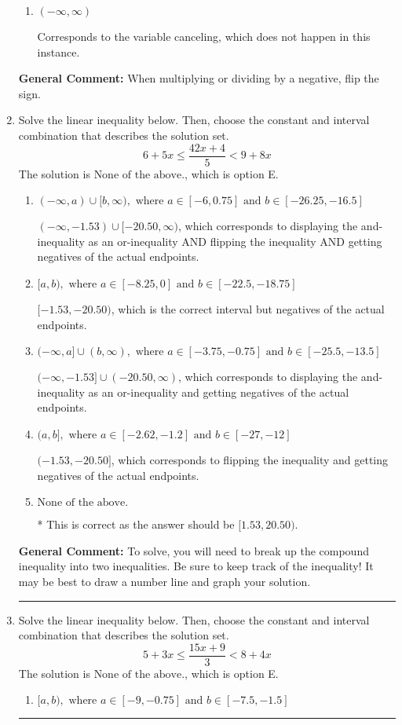 \documentclass{extbook}[14pt]
\newcommand{\litem}[1]{\item #1

\rule{\textwidth}{0.4pt}}
\begin{document}
\begin{enumerate}
{\begin{enumerate}[label=\Alph*.]
 * Correct option.
\item \( (-\infty, \infty) \)

Corresponds to the variable canceling, which does not happen in this instance.
\end{enumerate}

\textbf{General Comment:} When multiplying or dividing by a negative, flip the sign.
}
\litem{
Solve the linear inequality below. Then, choose the constant and interval combination that describes the solution set.
\[ 6 + 5 x \leq \frac{42 x + 4}{5} < 9 + 8 x \]The solution is \( \text{None of the above.} \), which is option E.\begin{enumerate}[label=\Alph*.]
\item \( (-\infty, a) \cup [b, \infty), \text{ where } a \in [-6, 0.75] \text{ and } b \in [-26.25, -16.5] \)

$(-\infty, -1.53) \cup [-20.50, \infty)$, which corresponds to displaying the and-inequality as an or-inequality AND flipping the inequality AND getting negatives of the actual endpoints.
\item \( [a, b), \text{ where } a \in [-8.25, 0] \text{ and } b \in [-22.5, -18.75] \)

$[-1.53, -20.50)$, which is the correct interval but negatives of the actual endpoints.
\item \( (-\infty, a] \cup (b, \infty), \text{ where } a \in [-3.75, -0.75] \text{ and } b \in [-25.5, -13.5] \)

$(-\infty, -1.53] \cup (-20.50, \infty)$, which corresponds to displaying the and-inequality as an or-inequality and getting negatives of the actual endpoints.
\item \( (a, b], \text{ where } a \in [-2.62, -1.2] \text{ and } b \in [-27, -12] \)

$(-1.53, -20.50]$, which corresponds to flipping the inequality and getting negatives of the actual endpoints.
\item \( \text{None of the above.} \)

* This is correct as the answer should be $[1.53, 20.50)$.
\end{enumerate}

\textbf{General Comment:} To solve, you will need to break up the compound inequality into two inequalities. Be sure to keep track of the inequality! It may be best to draw a number line and graph your solution.
}
\litem{
Solve the linear inequality below. Then, choose the constant and interval combination that describes the solution set.
\[ 5 + 3 x \leq \frac{15 x + 9}{3} < 8 + 4 x \]The solution is \( \text{None of the above.} \), which is option E.\begin{enumerate}[label=\Alph*.]
\item \( [a, b), \text{ where } a \in [-9, -0.75] \text{ and } b \in [-7.5, -1.5] \)


\end{enumerate}}
\end{enumerate}
\end{document}
